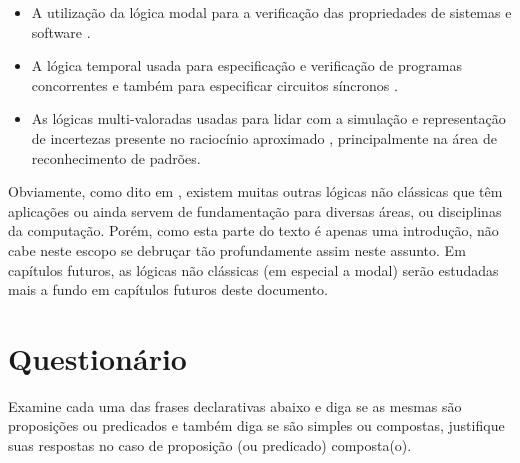 \begin{itemize}
	\item A utilização da lógica modal para a verificação das propriedades de sistemas e software \cite{harel1979}.
	\item A lógica temporal usada para especificação e verificação de programas
concorrentes \cite{manna1979} e também para especificar circuitos síncronos \cite{halpern1983}.
	\item As lógicas multi-valoradas usadas para lidar com a simulação e representação de
incertezas presente no raciocínio aproximado \cite{benja-Logica}, principalmente na área de reconhecimento de padrões.
\end{itemize}

Obviamente, como dito em \cite{benja-Logica}, existem muitas outras lógicas não clássicas que têm aplicações ou ainda servem de fundamentação para diversas áreas, ou disciplinas da computação. Porém, como esta parte do texto é apenas uma introdução, não cabe neste escopo se debruçar tão profundamente assim neste assunto. Em capítulos futuros, as lógicas não clássicas (em especial a modal) serão estudadas mais a fundo em capítulos futuros deste documento.

\section{Questionário}\label{sec:Questionario1part3}

\begin{questao}
	Examine cada uma das frases declarativas abaixo e diga se as mesmas são proposições ou predicados e também diga se são simples ou compostas, justifique suas respostas no caso de proposição (ou predicado) composta(o).
\end{questao}

